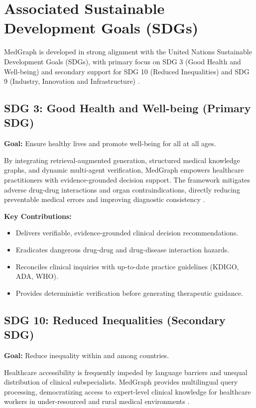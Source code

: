 \documentclass[conference]{IEEEtran}
\begin{document}
\section{Associated Sustainable Development Goals (SDGs)}

MedGraph is developed in strong alignment with the United Nations Sustainable Development Goals (SDGs), with primary focus on SDG 3 (Good Health and Well-being) and secondary support for SDG 10 (Reduced Inequalities) and SDG 9 (Industry, Innovation and Infrastructure) \cite{ai6100240,info17020133,LAWANNA2026100926}.

\subsection{SDG 3: Good Health and Well-being (Primary SDG)}
\textbf{Goal:} Ensure healthy lives and promote well-being for all at all ages.

By integrating retrieval-augmented generation, structured medical knowledge graphs, and dynamic multi-agent verification, MedGraph empowers healthcare practitioners with evidence-grounded decision support. The framework mitigates adverse drug-drug interactions and organ contraindications, directly reducing preventable medical errors and improving diagnostic consistency \cite{ai6100240,WANG2025100504,LAWANNA2026100926}.

\textbf{Key Contributions:}
\begin{itemize}
    \item Delivers verifiable, evidence-grounded clinical decision recommendations.
    \item Eradicates dangerous drug-drug and drug-disease interaction hazards.
    \item Reconciles clinical inquiries with up-to-date practice guidelines (KDIGO, ADA, WHO).
    \item Provides deterministic verification before generating therapeutic guidance.
\end{itemize}

\subsection{SDG 10: Reduced Inequalities (Secondary SDG)}
\textbf{Goal:} Reduce inequality within and among countries.

Healthcare accessibility is frequently impeded by language barriers and unequal distribution of clinical subspecialists. MedGraph provides multilingual query processing, democratizing access to expert-level clinical knowledge for healthcare workers in under-resourced and rural medical environments \cite{hema2026voice}.
\end{document}
